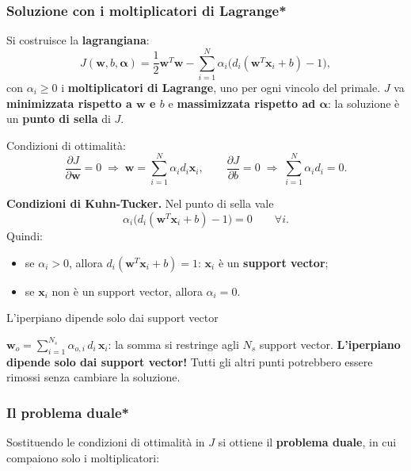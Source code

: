 \subsubsection{Soluzione con i moltiplicatori di
Lagrange*}\label{soluzione-con-i-moltiplicatori-di-lagrange}

Si costruisce la \textbf{lagrangiana}: \[
J(\mathbf{w}, b, \boldsymbol{\alpha}) = \frac{1}{2}\mathbf{w}^T\mathbf{w} - \sum_{i=1}^{N}\alpha_i\big(d_i(\mathbf{w}^T\mathbf{x}_i + b) - 1\big),
\] con \(\alpha_i \ge 0\) i \textbf{moltiplicatori di Lagrange}, uno per
ogni vincolo del primale. \(J\) va \textbf{minimizzata rispetto a
\(\mathbf{w}\) e \(b\)} e \textbf{massimizzata rispetto ad
\(\boldsymbol{\alpha}\)}: la soluzione è un \textbf{punto di sella} di
\(J\).

Condizioni di ottimalità: \[
\frac{\partial J}{\partial \mathbf{w}} = 0 \;\Rightarrow\; \mathbf{w} = \sum_{i=1}^{N}\alpha_i d_i\mathbf{x}_i, \qquad \frac{\partial J}{\partial b} = 0 \;\Rightarrow\; \sum_{i=1}^{N}\alpha_i d_i = 0.
\]

\textbf{Condizioni di Kuhn-Tucker.} Nel punto di sella vale \[
\alpha_i\big(d_i(\mathbf{w}^T\mathbf{x}_i + b) - 1\big) = 0 \qquad \forall i.
\] Quindi:

\begin{itemize}
\tightlist
\item
  se \(\alpha_i > 0\), allora \(d_i(\mathbf{w}^T\mathbf{x}_i + b) = 1\):
  \(\mathbf{x}_i\) è un \textbf{support vector};
\item
  se \(\mathbf{x}_i\) non è un support vector, allora \(\alpha_i = 0\).
\end{itemize}

\begin{boxtip}{L'iperpiano dipende solo dai support vector}

\(\mathbf{w}_o = \sum_{i=1}^{N_s}\alpha_{o,i}\,d_i\,\mathbf{x}_i\): la
somma si restringe agli \(N_s\) support vector. \textbf{L'iperpiano
dipende solo dai support vector!} Tutti gli altri punti potrebbero
essere rimossi senza cambiare la soluzione.

\end{boxtip}

\subsubsection{Il problema duale*}\label{il-problema-duale}

Sostituendo le condizioni di ottimalità in \(J\) si ottiene il
\textbf{problema duale}, in cui compaiono solo i moltiplicatori:

